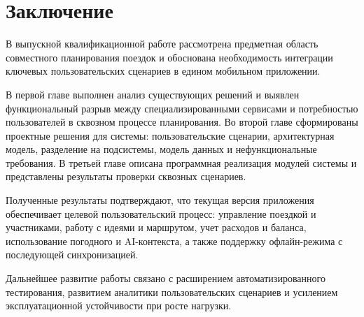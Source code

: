 \section{Заключение}

В выпускной квалификационной работе рассмотрена предметная область совместного планирования поездок и обоснована необходимость интеграции ключевых пользовательских сценариев в едином мобильном приложении.

В первой главе выполнен анализ существующих решений и выявлен функциональный разрыв между специализированными сервисами и потребностью пользователей в сквозном процессе планирования. Во второй главе сформированы проектные решения для системы: пользовательские сценарии, архитектурная модель, разделение на подсистемы, модель данных и нефункциональные требования. В третьей главе описана программная реализация модулей системы и представлены результаты проверки сквозных сценариев.

Полученные результаты подтверждают, что текущая версия приложения обеспечивает целевой пользовательский процесс: управление поездкой и участниками, работу с идеями и маршрутом, учет расходов и баланса, использование погодного и AI-контекста, а также поддержку офлайн-режима с последующей синхронизацией.

Дальнейшее развитие работы связано с расширением автоматизированного тестирования, развитием аналитики пользовательских сценариев и усилением эксплуатационной устойчивости при росте нагрузки.
